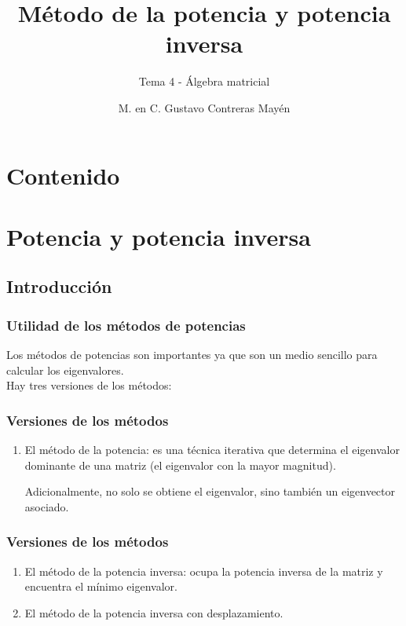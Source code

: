 \documentclass[12pt]{beamer}
\title{\large{Método de la potencia y potencia inversa}}
\subtitle{Tema 4 - Álgebra matricial}
\author{M. en C. Gustavo Contreras Mayén}
\date{}
\begin{document}
\maketitle

\section*{Contenido}

\section{Potencia y potencia inversa}
\subsection{Introducción}

\begin{frame}
\frametitle{Utilidad de los métodos de potencias}
Los métodos de potencias son importantes ya que son un medio sencillo para calcular los eigenvalores.
\\
\bigskip
\pause
Hay tres versiones de los métodos:
\end{frame}
\begin{frame}
\frametitle{Versiones de los métodos}
\begin{enumerate}[<+->]
\item El método de la potencia: es una técnica iterativa que determina el eigenvalor dominante de una matriz (el eigenvalor con la mayor magnitud).

Adicionalmente, no solo se obtiene el eigenvalor, sino también un eigenvector asociado.
\seti
\end{enumerate}
\end{frame}
\begin{frame}
\frametitle{Versiones de los métodos}
\begin{enumerate}[<+->]
\seti
\item El método de la potencia inversa: ocupa la potencia inversa de la matriz y encuentra el mínimo eigenvalor.
\item El método de la potencia inversa con desplazamiento.
\end{enumerate}
\end{frame}
\end{document}
